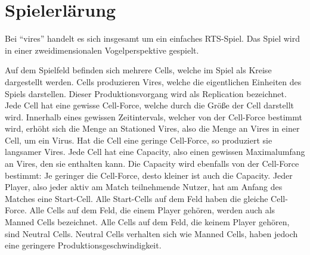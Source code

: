 \section{Spielerlärung}

Bei ``vires'' handelt es sich insgesamt um ein einfaches RTS-Spiel. 
Das Spiel wird in einer zweidimensionalen Vogelperspektive gespielt.

Auf dem Spielfeld befinden sich mehrere Cells, welche im Spiel als Kreise dargestellt werden.
Cells produzieren Vires, welche die eigentlichen Einheiten des Spiels darstellen. Dieser Produktionsvorgang wird als Replication bezeichnet.
Jede Cell hat eine gewisse Cell-Force, welche durch die Größe der Cell darstellt wird.
Innerhalb eines gewissen Zeitintervals, welcher von der Cell-Force bestimmt wird, erhöht sich die Menge an Stationed Vires, also die Menge an Vires in einer Cell, um ein Virus.
Hat die Cell eine geringe Cell-Force, so produziert sie langsamer Vires.
Jede Cell hat eine Capacity, also einen gewissen Maximalumfang an Vires, den sie enthalten kann.
Die Capacity wird ebenfalls von der Cell-Force bestimmt: Je geringer die Cell-Force, desto kleiner ist auch die Capacity.
Jeder Player, also jeder aktiv am Match teilnehmende Nutzer, hat am Anfang des Matches eine Start-Cell. 
Alle Start-Cells auf dem Feld haben die gleiche Cell-Force.
Alle Cells auf dem Feld, die einem Player gehören, werden auch als Manned Cells bezeichnet.
Alle Cells auf dem Feld, die keinem Player gehören, sind Neutral Cells. Neutral Cells verhalten sich wie Manned Cells, haben jedoch eine geringere Produktionsgeschwindigkeit.

